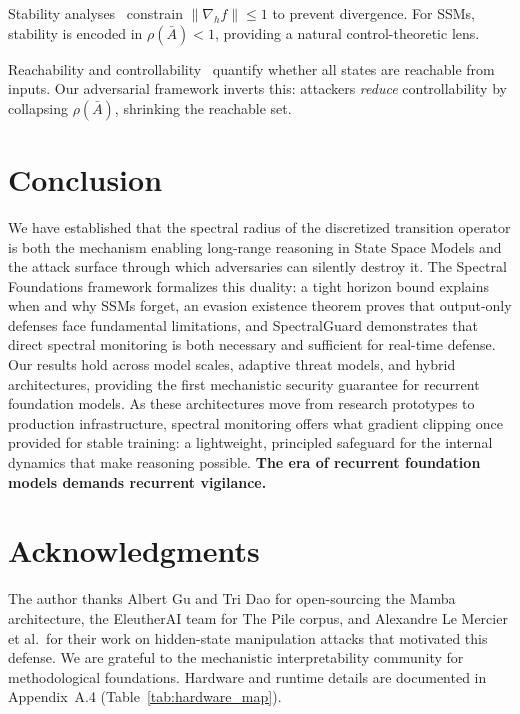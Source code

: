 \documentclass[10pt,twocolumn]{article}
\begin{document}
Stability analyses~\cite{li2018stabilizing,orvieto2023resurrecting} constrain $\|\nabla_h f\| \le 1$ to prevent divergence. For SSMs, stability is encoded in $\rho(\bar{A}) < 1$, providing a natural control-theoretic lens.

Reachability and controllability~\cite{kalman1960contributions} quantify whether all states are reachable from inputs. Our adversarial framework inverts this: attackers \emph{reduce} controllability by collapsing $\rho(\bar{A})$, shrinking the reachable set.

\section{Conclusion}
\label{sec:conclusion}

We have established that the spectral radius of the discretized transition operator is both the mechanism enabling long-range reasoning in State Space Models and the attack surface through which adversaries can silently destroy it. The Spectral Foundations framework formalizes this duality: a tight horizon bound explains when and why SSMs forget, an evasion existence theorem proves that output-only defenses face fundamental limitations, and SpectralGuard demonstrates that direct spectral monitoring is both necessary and sufficient for real-time defense. Our results hold across model scales, adaptive threat models, and hybrid architectures, providing the first mechanistic security guarantee for recurrent foundation models. As these architectures move from research prototypes to production infrastructure, spectral monitoring offers what gradient clipping once provided for stable training: a lightweight, principled safeguard for the internal dynamics that make reasoning possible. \textbf{The era of recurrent foundation models demands recurrent vigilance.}

\section*{Acknowledgments}

The author thanks Albert Gu and Tri Dao for open-sourcing the Mamba architecture, the EleutherAI team for The Pile corpus, and Alexandre Le Mercier et al.\ for their work on hidden-state manipulation attacks that motivated this defense. We are grateful to the mechanistic interpretability community for methodological foundations. Hardware and runtime details are documented in Appendix~A.4 (Table~\ref{tab:hardware_map}).
\end{document}
